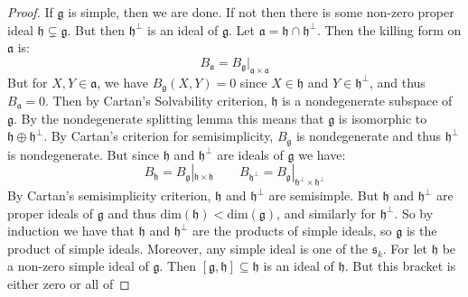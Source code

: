 \documentclass[crop=false,class=article]{standalone}                           %
\begin{document}
        \begin{proof}
            If $\mathfrak{g}$ is simple, then we are done. If not then there is
            some non-zero proper ideal $\mathfrak{h}\subsetneq\mathfrak{g}$.
            But then $\mathfrak{h}^{\perp}$ is an ideal of $\mathfrak{g}$. Let
            $\mathfrak{a}=\mathfrak{h}\cap\mathfrak{h}^{\perp}$. Then the
            killing form on $\mathfrak{a}$ is:
            \begin{equation}
                B_{\mathfrak{a}}
                =B_{\mathfrak{g}}|_{\mathfrak{a}\times\mathfrak{a}}
            \end{equation}
            But for $X,Y\in\mathfrak{a}$, we have $B_{\mathfrak{g}}(X,Y)=0$
            since $X\in\mathfrak{h}$ and $Y\in\mathfrak{h}^{\perp}$, and thus
            $B_{\mathfrak{a}}=0$. Then by Cartan's Solvability criterion,
            $\mathfrak{h}$ is a nondegenerate subspace of $\mathfrak{g}$. By the
            nondegenerate splitting lemma this means that $\mathfrak{g}$ is
            isomorphic to $\mathfrak{h}\oplus\mathfrak{h}^{\perp}$. By
            Cartan's criterion for semisimplicity, $B_{\mathfrak{g}}$ is
            nondegenerate and thus $\mathfrak{h}^{\perp}$ is nondegenerate.
            But since $\mathfrak{h}$ and $\mathfrak{h}^{\perp}$ are ideals of
            $\mathfrak{g}$ we have:
            \begin{equation}
                B_{\mathfrak{h}}
                =B_{\mathfrak{g}}|_{\mathfrak{h}\times\mathfrak{h}}
                \quad\quad
                B_{\mathfrak{h}^{\perp}}
                =B_{\mathfrak{g}}
                    |_{\mathfrak{h^{\perp}}\times\mathfrak{h}^{\perp}}
            \end{equation}
            By Cartan's semisimplicity criterion, $\mathfrak{h}$ and
            $\mathfrak{h}^{\perp}$ are semisimple. But $\mathfrak{h}$ and
            $\mathfrak{h}^{\perp}$ are proper ideals of $\mathfrak{g}$ and thus
            $\textrm{dim}(\mathfrak{h})<\textrm{dim}(\mathfrak{g})$, and
            similarly for $\mathfrak{h}^{\perp}$. So by induction we have that
            $\mathfrak{h}$ and $\mathfrak{h}^{\perp}$ are the products of
            simple ideals, so $\mathfrak{g}$ is the product of simple ideals.
            Moreover, any simple ideal is one of the $\mathfrak{s}_{k}$. For let
            $\mathfrak{h}$ be a non-zero simple ideal of $\mathfrak{g}$. Then
            $[\mathfrak{g},\mathfrak{h}]\subseteq\mathfrak{h}$ is an ideal of
            $\mathfrak{h}$. But this bracket is either zero or all of

\end{proof}
\end{document}
